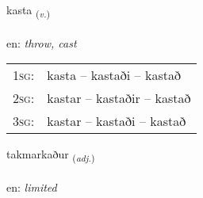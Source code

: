 \documentclass[frontgrid, backgrid]{flacards}\usepackage[]{graphicx}\usepackage[]{color}
\begin{document}
\renewcommand{\flhead}{\vskip5pt \fboxsep=0pt {\small\bfseries\footnotesize Sagnorð | Verb}}
\renewcommand{\fcfoot}{\vskip5pt \fboxsep=0pt \hspace{2pt}{\small\bfseries\footnotesize 2K}}

\renewcommand{\blhead}{\vskip5pt {\small\bfseries\footnotesize Sagnorð | Verb }}
\renewcommand{\bcfoot}{\vskip5pt \hspace{2pt}{\small\bfseries\footnotesize 2K}}


{kasta \small{\textsubscript{(\textit{v.})}} \\[1ex] %
\textphonetic{[kʰasta]} \\
en: \emph{throw, cast} \\  [2ex]
\renewcommand*{\arraystretch}{0.8}
\begin{tabular}{p{1cm}l}
\textsc{1sg}: & kasta -- kastaði -- kastað \\ 
\textsc{2sg}: & kastar -- kastaðir -- kastað \\ 
\textsc{3sg}: & kastar -- kastaði -- kastað \\ 
\end{tabular}
}

\renewcommand{\flhead}{\vskip5pt \fboxsep=0pt {\small\bfseries\footnotesize Lýsingarorð | Adjective}}
\renewcommand{\fcfoot}{\vskip5pt \fboxsep=0pt \hspace{2pt}{\small\bfseries\footnotesize 2K}}

\renewcommand{\blhead}{\vskip5pt {\small\bfseries\footnotesize Lýsingarorð | Adjective }}
\renewcommand{\bcfoot}{\vskip5pt \hspace{2pt}{\small\bfseries\footnotesize 2K}}


{takmarkaður \small{\textsubscript{(\textit{adj.})}} \\[1ex] %
 \\
en: \emph{limited} \\  [2ex]
\renewcommand*{\arraystretch}{0.8}
}
\end{document}
